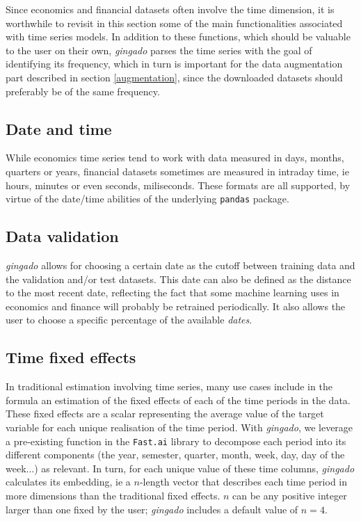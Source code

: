 \documentclass{article}
\begin{document}
Since economics and financial datasets often involve the time dimension, it is worthwhile to revisit in this section some of the main functionalities associated with time series models. In addition to these functions, which should be valuable to the user on their own, \textit{gingado} parses the time series with the goal of identifying its frequency, which in turn is important for the data augmentation part described in section \ref{augmentation}, since the downloaded datasets should preferably be of the same frequency.


\subsection{Date and time}

While economics time series tend to work with data measured in days, months, quarters or years, financial datasets sometimes are measured in intraday time, ie hours, minutes or even seconds, miliseconds. These formats are all supported, by virtue of the date/time abilities of the underlying \texttt{pandas} package.

\subsection{Data validation}

\textit{gingado} allows for choosing a certain date as the cutoff between training data and the validation and/or test datasets. This date can also be defined as the distance to the most recent date, reflecting the fact that some machine learning uses in economics and finance will probably be retrained periodically. It also allows the user to choose a specific percentage of the available \textit{dates}.

\subsection{Time fixed effects}\label{timeproc}

In traditional estimation involving time series, many use cases include in the formula an estimation of the fixed effects of each of the time periods in the data. These fixed effects are a scalar representing the average value of the target variable for each unique realisation of the time period. With \textit{gingado}, we leverage a pre-existing function in the \texttt{Fast.ai} library to decompose each period into its different components (the year, semester, quarter, month, week, day, day of the week...) as relevant. In turn, for each unique value of these time columns, \textit{gingado} calculates its embedding, ie a $n$-length vector that describes each time period in more dimensions than the traditional fixed effects. $n$ can be any positive integer larger than one fixed by the user; \textit{gingado} includes a default value of $n=4$.
\end{document}
